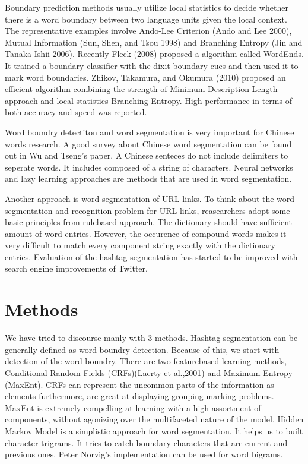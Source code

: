\documentclass[12pt]{comjnl}
\begin{document}
Boundary prediction methods usually utilize local statistics
to decide whether there is a word
boundary between two language units given the local context. The representative
examples involve Ando-Lee Criterion (Ando and Lee 2000),
Mutual Information (Sun, Shen, and Tsou 1998) and
Branching Entropy (Jin and Tanaka-Ishii 2006). Recently
Fleck (2008) proposed a algorithm called
WordEnds. It trained a boundary classifier with the dixit
boundary cues and then used it to mark word boundaries.
Zhikov, Takamura, and Okumura (2010) proposed
an efficient algorithm combining the strength of Minimum
Description Length approach and local statistics Branching Entropy.
High performance in terms of both accuracy and speed was
reported.

Word boundry detectiton
and word segmentation is very important for Chinese words research. A good survey about
Chinese word segmentation can be found out in Wu and Tseng's paper. A Chinese senteces do not
include delimiters to seperate words. It includes composed of a string of characters. Neural
networks and lazy learning approaches are methods that are used in word segmentation.

Another approach is word segmentation of URL links. To think about the word segmentation and
recognition problem for URL links, reasearchers adopt some basic principles from rule­based
approach. The dictionary should have sufficient amount of word entries. However, the occurence
of compound words makes it very difficult to match every component string exactly with the
dictionary entries. Evaluation of the hashtag segmentation has started to be improved with search engine
improvements of Twitter.

\section{Methods}
We have tried to discourse manly with 3 methods. Hashtag segmentation can be generally defined as word boundry detection. Because of this, we
start with detection of the word boundry. There are two feature­based learning methods,
Conditional Random Fields (CRFs)(Laerty et al.,2001) and Maximum Entropy (MaxEnt).
CRFs can represent the uncommon parts of the information as elements furthermore, are great at
displaying grouping marking problems. MaxEnt is extremely compelling at learning with a high
assortment of components, without agonizing over the multifaceted nature of the model. Hidden
Markov Model is a simplistic approach for word segmentation. It helps us to built character
trigrams. It tries to catch boundary characters that are current and previous ones. Peter Norvig's
implementation can be used for word bigrams.
\end{document}
